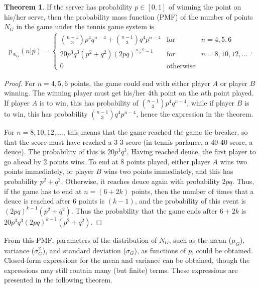 \documentclass[11pt]{article}
\theoremstyle{plain}
\theoremstyle{definition}
\newtheorem{theorem}{Theorem}[section]
\begin{document}
\begin{theorem}
   If the server has probability $p \in [0,1]$ of winning the point on his/her serve, then the probability mass function (PMF) of the number of points $N_G$ in the game under the tennis game system is
    \begin{eqnarray*}
        p_{N_G}(n|p) =  \left\{
        \begin{array}{ccc}
        {{n-1} \choose 3} p^4 q^{n-4} + {{n-1} \choose 3} q^4 p^{n-4} & \mbox{for} & n = 4,5,6\\
        20p^3q^3(p^2+q^2)(2pq)^{\frac{n-6}{2}-1} & \mbox{for} & n = 8, 10, 12, \ldots \\
        0 & \mbox{otherwise} 
        \end{array}
        \right..
    \end{eqnarray*}
\end{theorem}

\begin{proof}
    For $n = 4, 5, 6$ points, the game could end with either player $A$ or player $B$ winning. The winning player must get his/her 4th point on the $n$th point played. If player $A$ is to win, this has probability of ${{n-1} \choose 3} p^4 q^{n-4}$, while if player $B$ is to win, this has probability ${{n-1} \choose 3} q^4 p^{n-4}$, hence the expression  in the theorem.

    For $n = 8, 10, 12, \ldots$, this means that the game reached the game tie-breaker, so that the score must have reached a 3-3 score (in tennis parlance, a 40-40 score, a deuce). The probability of this is $20p^3q^3$. Having reached deuce, the first player to go ahead by 2 points wins. To end at 8 points played, either player $A$ wins two points immediately, or player $B$ wins two points immediately, and this has probability $p^2+q^2$. Otherwise, it reaches deuce again with probability $2pq$. Thus, if the game has to end at $n=(6 + 2k)$ points, then the number of times that a deuce is reached after 6 points is $(k-1)$, and the probability of this event is $(2pq)^{k-1} (p^2+q^2)$. Thus the probability that the game ends after $6+2k$ is $20p^3q^3 (2pq)^{k-1} (p^2+q^2)$. 
\end{proof}

From this PMF, parameters of the distribution of $N_G$, such as the mean ($\mu_G$), variance ($\sigma_G^2$), and standard deviation ($\sigma_G$), as functions of $p$, could be obtained. Closed-form expressions for the mean and variance can be obtained, though the expressions may still contain many (but finite) terms. These expressions are presented in the following theorem.
\end{document}
